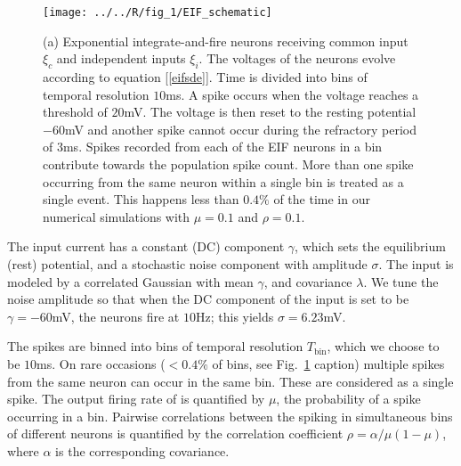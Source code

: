 \documentclass[%
 reprint,
 amsmath,amssymb,
 aps,
floatfix,
]{revtex4-1}
\begin{document}
\begin{figure}[t!]
\texttt{[image: ../../R/fig\_1/EIF\_schematic]}
\caption{\label{fig:schematic} (a) Exponential integrate-and-fire neurons receiving common input $\xi_c$ and independent inputs $\xi_i$. The voltages of the neurons evolve according to equation [\ref{eifsde}]. Time is divided into bins of temporal resolution $10$ms. A spike occurs when the voltage reaches a threshold of $20$mV. The voltage is then reset to the resting potential $-60$mV and another spike cannot occur during the refractory period of $3$ms. Spikes recorded from each of the EIF neurons in a bin contribute towards the population spike count.  More than one spike occurring from the same neuron within a single bin is treated as a single event. This happens less than $0.4\%$ of the time in our numerical simulations with $\mu=0.1$ and $\rho=0.1$.}
\end{figure}

The input current has a constant (DC) component $\gamma$, which sets the equilibrium (rest) potential, and a stochastic noise component with amplitude $\sigma$. The input is modeled by a correlated Gaussian with mean $\gamma$, and covariance $\lambda$.  We tune the noise amplitude so that when the DC component of the input is set to be $\gamma = -60$mV, the neurons fire at $10$Hz; this yields $\sigma = 6.23$mV.

The spikes are binned into bins of temporal resolution $T_\text{bin}$, which we choose to be $10$ms. On rare occasions ($<0.4\%$ of bins, see Fig.~\ref{fig:schematic} caption) multiple spikes from the same neuron can occur in the same bin. These are considered as a single spike.  The output firing rate of is quantified by $\mu$, the probability of a spike occurring in a bin.  Pairwise correlations between the spiking in simultaneous bins of different neurons is quantified by the correlation coefficient $\rho=\alpha/\mu(1-\mu)$, where $\alpha$ is the corresponding covariance.




\end{document}
